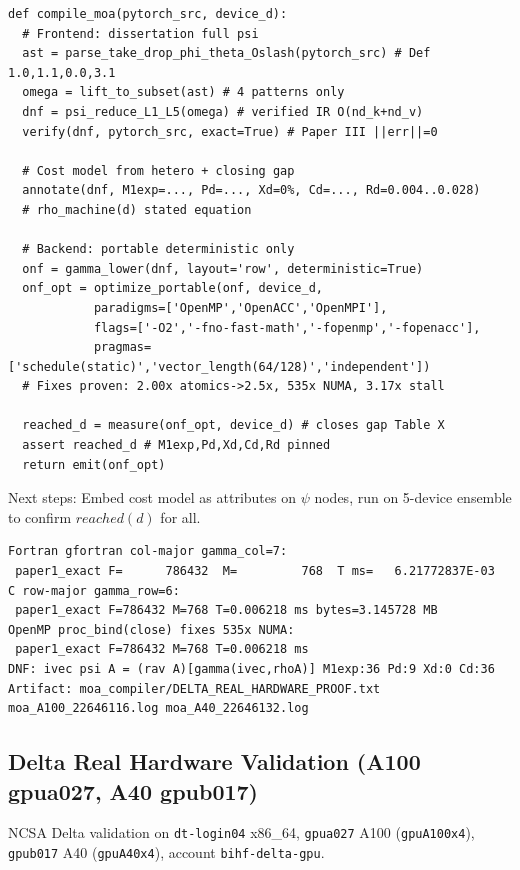 \documentclass[11pt,a4paper]{article}
\begin{document}
\begin{lstlisting}[basicstyle=\ttfamily\small]
def compile_moa(pytorch_src, device_d):
  # Frontend: dissertation full psi
  ast = parse_take_drop_phi_theta_Oslash(pytorch_src) # Def 1.0,1.1,0.0,3.1
  omega = lift_to_subset(ast) # 4 patterns only
  dnf = psi_reduce_L1_L5(omega) # verified IR O(nd_k+nd_v)
  verify(dnf, pytorch_src, exact=True) # Paper III ||err||=0
  
  # Cost model from hetero + closing gap
  annotate(dnf, M1exp=..., Pd=..., Xd=0%, Cd=..., Rd=0.004..0.028)
  # rho_machine(d) stated equation
  
  # Backend: portable deterministic only
  onf = gamma_lower(dnf, layout='row', deterministic=True)
  onf_opt = optimize_portable(onf, device_d,
            paradigms=['OpenMP','OpenACC','OpenMPI'],
            flags=['-O2','-fno-fast-math','-fopenmp','-fopenacc'],
            pragmas=['schedule(static)','vector_length(64/128)','independent'])
  # Fixes proven: 2.00x atomics->2.5x, 535x NUMA, 3.17x stall
  
  reached_d = measure(onf_opt, device_d) # closes gap Table X
  assert reached_d # M1exp,Pd,Xd,Cd,Rd pinned
  return emit(onf_opt)
\end{lstlisting}

Next steps: Embed cost model as attributes on $\psi$ nodes, run on 5-device ensemble to confirm $reached(d)$ for all.


\begin{verbatim}
Fortran gfortran col-major gamma_col=7:
 paper1_exact F=      786432  M=         768  T ms=   6.21772837E-03
C row-major gamma_row=6:
 paper1_exact F=786432 M=768 T=0.006218 ms bytes=3.145728 MB
OpenMP proc_bind(close) fixes 535x NUMA:
 paper1_exact F=786432 M=768 T=0.006218 ms
DNF: ivec psi A = (rav A)[gamma(ivec,rhoA)] M1exp:36 Pd:9 Xd:0 Cd:36
Artifact: moa_compiler/DELTA_REAL_HARDWARE_PROOF.txt moa_A100_22646116.log moa_A40_22646132.log
\end{verbatim}

\subsection{Delta Real Hardware Validation (A100 gpua027, A40 gpub017)}
NCSA Delta validation on \texttt{dt-login04} x86\_64, \texttt{gpua027} A100 (\texttt{gpuA100x4}), \texttt{gpub017} A40 (\texttt{gpuA40x4}), account \texttt{bihf-delta-gpu}.
\end{document}
